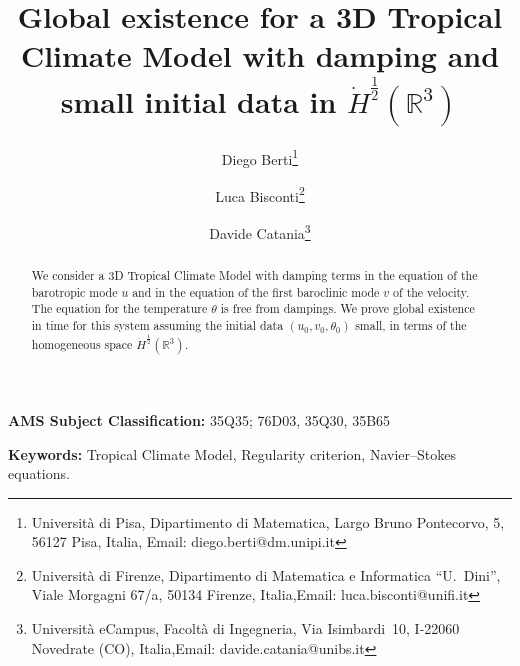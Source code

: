 \documentclass[a4paper]{article}
\date{\empty}
\newcommand{\R}{\mathbb{R}}
\begin{document}
  \title{Global existence for a 3D Tropical Climate Model with damping
    and small initial data in $\dot H^{\frac{1}{2}}(\R^3)$}
    
\author{
Diego Berti\footnote{Universit\`a di Pisa, Dipartimento di Matematica, Largo
    Bruno Pontecorvo, 5, 56127 Pisa, Italia, \newline Email: diego.berti@dm.unipi.it}
\and
Luca Bisconti\footnote{Universit\`a di Firenze, Dipartimento di Matematica e
    Informatica ``U.~Dini'', Viale Morgagni 67/a, 50134 Firenze, Italia,\newline Email: luca.bisconti@unifi.it}
\and
Davide Catania\footnote{Universit\`a eCampus, Facolt\`a di Ingegneria, Via
    Isimbardi\, 10, I-22060 Novedrate (CO), Italia,\newline Email: davide.catania@unibs.it}
  }  

\maketitle

  \begin{abstract}
We consider a 3D Tropical Climate Model with damping
terms in the equation of the barotropic mode $u$ and in the equation
of the first baroclinic mode $v$ of the velocity.  The equation for
the temperature $\theta$ is free from dampings.  We prove global
existence in time for this system assuming the initial data $(u_0,
v_0,\theta_0)$ small, in terms of the homogeneous space $\dot
H^{\frac{1}{2}}(\R^3)$.
\end{abstract}

\vspace{0.5 cm}
\noindent \textbf{AMS Subject Classification:}  35Q35; 76D03, 35Q30,
    35B65

\smallskip
\noindent
\textbf{Keywords:} Tropical Climate Model, Regularity criterion, Navier--Stokes equations.
    
\end{document}
